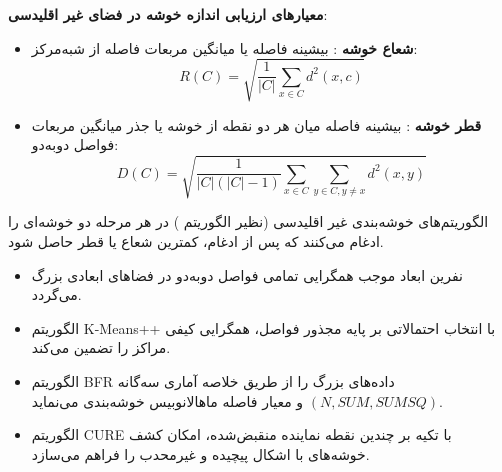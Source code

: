 \textbf{معیارهای ارزیابی اندازه خوشه در فضای غیر اقلیدسی}:
\begin{itemize}
    \item \textbf{شعاع خوشه }: بیشینه فاصله یا میانگین مربعات فاصله از شبه‌مرکز:
    \begin{equation}
    R(C) = \sqrt{\frac{1}{|C|} \sum_{x \in C} d^2(x, c)}
    \end{equation}
    \item \textbf{قطر خوشه }: بیشینه فاصله میان هر دو نقطه از خوشه یا جذر میانگین مربعات فواصل دوبه‌دو:
    \begin{equation}
    D(C) = \sqrt{\frac{1}{|C|(|C|-1)} \sum_{x \in C} \sum_{y \in C, y \ne x} d^2(x, y)}
    \end{equation}
\end{itemize}
الگوریتم‌های خوشه‌بندی غیر اقلیدسی (نظیر الگوریتم ) در هر مرحله دو خوشه‌ای را ادغام می‌کنند که پس از ادغام، کمترین شعاع یا قطر حاصل شود.

\begin{summarybox}
\begin{itemize}
    \item نفرین ابعاد موجب همگرایی تمامی فواصل دوبه‌دو در فضاهای ابعادی بزرگ می‌گردد.
    \item الگوریتم K-Means++ با انتخاب احتمالاتی بر پایه مجذور فواصل، همگرایی کیفی مراکز را تضمین می‌کند.
    \item الگوریتم BFR داده‌های بزرگ را از طریق خلاصه آماری سه‌گانه $(N, SUM, SUMSQ)$ و معیار فاصله ماهالانوبیس خوشه‌بندی می‌نماید.
    \item الگوریتم CURE با تکیه بر چندین نقطه نماینده منقبض‌شده، امکان کشف خوشه‌های با اشکال پیچیده و غیرمحدب را فراهم می‌سازد.
\end{itemize}
\end{summarybox}
